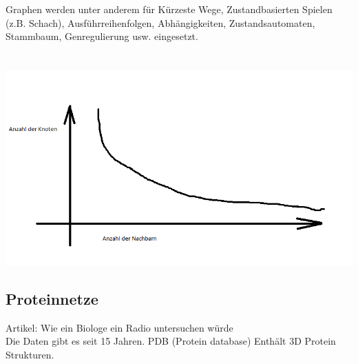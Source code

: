 \documentclass{article}
\begin{document}
Graphen werden unter anderem für Kürzeste Wege, Zustandbasierten Spielen (z.B. Schach), Ausführreihenfolgen, Abhängigkeiten, Zustandsautomaten, Stammbaum, Genregulierung usw. eingesetzt.
\\

\\

\\

\includegraphics[scale=0.5]{scalefree}\\

\subsection{Proteinnetze}
Artikel: Wie ein Biologe ein Radio untersuchen würde\\

Die Daten gibt es seit 15 Jahren. PDB (Protein database) Enthält 3D Protein Strukturen.\\
\end{document}
